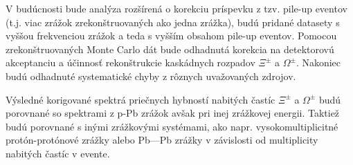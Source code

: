 V budúcnosti bude analýza rozšírená o korekciu príspevku z tzv. pile-up eventov (t.j. viac zrážok zrekonštruovaných ako jedna zrážka), budú pridané datasety 
s vyššou frekvenciou zrážok a teda s vyšším obsahom pile-up eventov. Pomocou zrekonštruovaných Monte Carlo dát bude odhadnutá korekcia na detektorovú akceptanciu 
a účinnosť rekonštrukcie kaskádnych rozpadov $\Xi^{\pm}$ a $\Omega^{\pm}$. Nakoniec budú odhadnuté systematické chyby z rôznych uvažovaných zdrojov.

Výsledné korigované spektrá priečnych hybností nabitých častíc $\Xi^{\pm}$ a $\Omega^{\pm}$ budú porovnané so spektrami z p-Pb zrážok avšak pri inej zrážkovej 
energii. Taktiež budú porovnané s inými zrážkovými systémami, ako napr. vysokomultiplicitné protón-protónové zrážky alebo Pb—Pb zrážky v závislosti od multiplicity 
nabitých častíc v evente.

